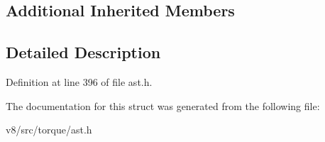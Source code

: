 \subsection*{Additional Inherited Members}


\subsection{Detailed Description}


Definition at line 396 of file ast.\+h.



The documentation for this struct was generated from the following file\+:\begin{DoxyCompactItemize}
\item 
v8/src/torque/ast.\+h\end{DoxyCompactItemize}
